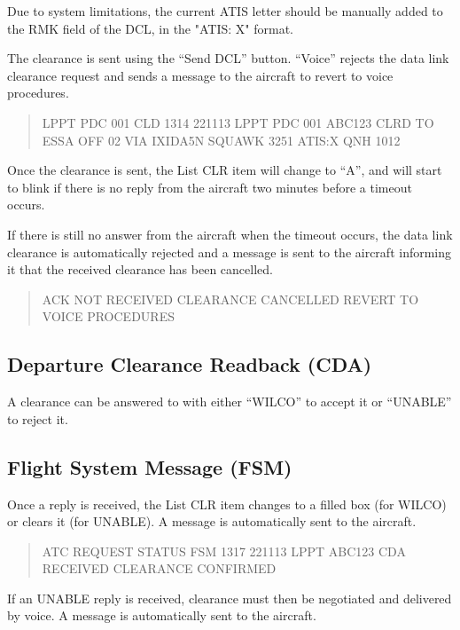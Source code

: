 \documentclass[11pt,a4paper,oldfontcommands]{memoir}
\newenvironment{Note}
  {\begin{shaded}\marginnote{\fbox{Note}}}
  {\end{shaded}}
\begin{document}
\begin{Note}
  Due to system limitations, the current ATIS letter should be manually added to the RMK field of the DCL, in the "ATIS: X" format.
\end{Note}

The clearance is sent using the “Send DCL” button. “Voice” rejects the data link clearance request and sends a message to the aircraft to revert to voice procedures. 

\begin{quote}
  LPPT PDC 001 CLD 1314 221113 LPPT PDC 001 ABC123 CLRD TO ESSA OFF 02 VIA IXIDA5N SQUAWK 3251 ATIS:X QNH 1012
\end{quote}

Once the clearance is sent, the List CLR item will change to “A”, and will start to blink if there is no reply from the aircraft two minutes before a timeout occurs.

If there is still no answer from the aircraft when the timeout occurs, the data link clearance is automatically rejected and a message is sent to the aircraft informing it that the received clearance has been cancelled.

\begin{quote}
  ACK NOT RECEIVED CLEARANCE CANCELLED REVERT TO VOICE PROCEDURES
\end{quote}

\subsection*{Departure Clearance Readback (CDA)}

A clearance can be answered to with either “WILCO” to accept it or “UNABLE” to reject it.

\subsection*{Flight System Message (FSM)}

Once a reply is received, the List CLR item changes to a filled box (for WILCO) or clears it (for UNABLE). A message is automatically sent to the aircraft.

\begin{quote}
  ATC REQUEST STATUS FSM 1317 221113 LPPT ABC123 CDA RECEIVED CLEARANCE CONFIRMED 
\end{quote}

If an UNABLE reply is received, clearance must then be negotiated and delivered by voice. A message is automatically sent to the aircraft.
\end{document}
